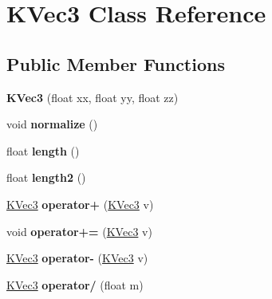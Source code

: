 \hypertarget{class_k_vec3}{
\section{KVec3 Class Reference}
\label{class_k_vec3}
}
\subsection*{Public Member Functions}
\begin{DoxyCompactItemize}
\item 
\hypertarget{class_k_vec3_aff67ff52d08e62b08488cedd659f6163}{
{\bfseries KVec3} (float xx, float yy, float zz)}
\label{class_k_vec3_aff67ff52d08e62b08488cedd659f6163}

\item 
\hypertarget{class_k_vec3_a5caeeb31aaba45d81401b73ebc095b5b}{
void {\bfseries normalize} ()}
\label{class_k_vec3_a5caeeb31aaba45d81401b73ebc095b5b}

\item 
\hypertarget{class_k_vec3_ae502a52e1abd10eb2e7452ffa7dfed43}{
float {\bfseries length} ()}
\label{class_k_vec3_ae502a52e1abd10eb2e7452ffa7dfed43}

\item 
\hypertarget{class_k_vec3_ac2e0d55cafa259e246471732a9a94219}{
float {\bfseries length2} ()}
\label{class_k_vec3_ac2e0d55cafa259e246471732a9a94219}

\item 
\hypertarget{class_k_vec3_a92b65ddfedf807099bac9b02d7cbe550}{
\hyperlink{class_k_vec3}{KVec3} {\bfseries operator+} (\hyperlink{class_k_vec3}{KVec3} v)}
\label{class_k_vec3_a92b65ddfedf807099bac9b02d7cbe550}

\item 
\hypertarget{class_k_vec3_a2d1680d20ebcf886f4a48edc24b56f22}{
void {\bfseries operator+=} (\hyperlink{class_k_vec3}{KVec3} v)}
\label{class_k_vec3_a2d1680d20ebcf886f4a48edc24b56f22}

\item 
\hypertarget{class_k_vec3_aa00b6d314acc1b051fba39eef270ffe4}{
\hyperlink{class_k_vec3}{KVec3} {\bfseries operator-\/} (\hyperlink{class_k_vec3}{KVec3} v)}
\label{class_k_vec3_aa00b6d314acc1b051fba39eef270ffe4}

\item 
\hypertarget{class_k_vec3_a0d3011d70125d653c43086e768877f98}{
\hyperlink{class_k_vec3}{KVec3} {\bfseries operator/} (float m)}
\label{class_k_vec3_a0d3011d70125d653c43086e768877f98}


\end{DoxyCompactItemize}
